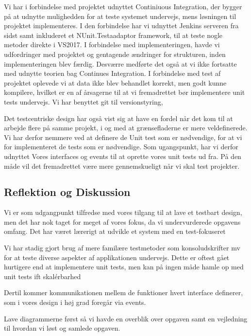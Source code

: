 Vi har i forbindelse med projektet udnyttet Continiuous Integration, 
der bygger på at udnytte mulighedden for at teste systemet undervejs, 
mens løsningen til projektet implementeres. 
I den forbindelse har vi udnyttet Jenkins serveren fra sidst samt inkluderet 
et NUnit.Testaadaptor framework, til at teste nogle metoder direkte i VS2017. 
I forbindelse med implementeringen, havde vi udfordringer med projektet 
og gentagende ændringer for strukturen, inden implementeringen blev færdig. 
Desværre medførte det også at vi ikke fortsatte med udnytte teorien bag Continues 
Integration. I forbindelse med test af projektet oplevede vi at data ikke blev 
behandlet korrekt, men godt kunne kompilere, hvilket er en af årsagerne til 
at vi fremadrettet bør implementere unit tests undervejs.
Vi har benyttet git til versionstyring, 

Det testcentriske design har også vist sig at have en fordel når det kom til at arbejde 
flere på samme projekt, i og med at grænsefladerne er mere veldefinerede. 
Vi har derfor nemmere ved at definere de Unit test som er nødvendige, 
for at vi for implementeret de tests som er nødvendige.
Som ugangspunkt, har vi derfor udnyttet Vores interfaces og events til 
at oprette vores unit tests ud fra. På den måde vil det fremadrettet være mere 
gennemskueligt når vi skal test projekter.



\subsection{Reflektion og Diskussion}
Vi er som udgangpunkt tilfredse med vores tilgang til at lave et testbart design, men det har nok taget for meget af vores fokus, da vi undervurderede opgavens omfang. 
Det har været lærerigt at udvikle et system med en test-fokuseret

Vi har stadig gjort brug af mere familære testmetoder som konsoludskrifter mv for at teste diverse aspekter af applikationen undervejs. 
Dette er oftest gået hurtigere end at implementere unit tests, men kan på ingen måde hamle op med unit tests ift skalérbarhed

Dertil kommer kommunikationen mellem de funktioner hvert interface definerer, som i vores design i høj grad foregår via events.

Lave diagrammerne først så vi havde en overblik over opgaven samt en vejledning til hvordan vi løst og samlede opgaven. 

 

